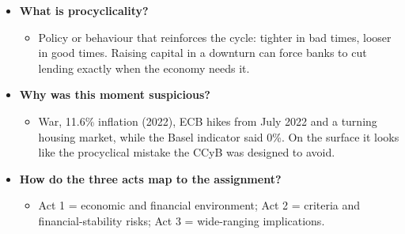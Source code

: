 \documentclass[10pt]{article}
\begin{document}
\begin{tcolorbox}[sbox,width=0.495\linewidth,height=14.6cm,nobeforeafter,box align=top,fit basedim=11pt,colframe=nlred!70,colbacktitle=nlred!8,coltitle=nlred,title=LIKELY CHALLENGES · definitions and logic]
\begin{itemize}
\item[\textcolor{navy}{\textbf{Q}}] \textbf{What is procyclicality?}
\begin{itemize}
\item Policy or behaviour that reinforces the cycle: tighter in bad times, looser in good times. Raising capital in a downturn can force banks to cut lending exactly when the economy needs it.
\end{itemize}
\item[\textcolor{navy}{\textbf{Q}}] \textbf{Why was this moment suspicious?}
\begin{itemize}
\item War, 11.6\% inflation (2022), ECB hikes from July 2022 and a turning housing market, while the Basel indicator said 0\%. On the surface it looks like the procyclical mistake the CCyB was designed to avoid.
\end{itemize}
\item[\textcolor{navy}{\textbf{Q}}] \textbf{How do the three acts map to the assignment?}
\begin{itemize}
\item Act 1 = economic and financial environment; Act 2 = criteria and financial-stability risks; Act 3 = wide-ranging implications.
\end{itemize}
\end{itemize}
\end{tcolorbox}
\newpage
\end{document}
